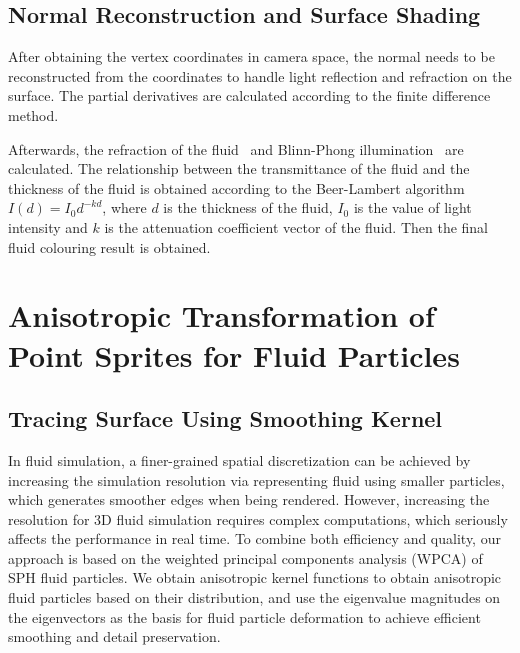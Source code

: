 \documentclass[times,twocolumn,final]{elsarticle}
\providecommand{\DIFaddend}{} %
\begin{document}
\DIFaddend \subsection{Normal Reconstruction and Surface Shading}
After obtaining the vertex coordinates in camera space, the normal needs to be reconstructed from the coordinates to handle light reflection and refraction on the surface. The partial derivatives are calculated according to the finite difference method.

Afterwards, the refraction of the fluid~\cite{ref:ref25} and Blinn-Phong illumination~\cite{ref:ref27} are calculated. The relationship between the transmittance of the fluid and the thickness of the fluid is obtained according to the Beer-Lambert algorithm\cite{ref:ref28} $I(d)=I_{0} d^{-k d}$, where $d$ is the thickness of the fluid, $I_0$ is the value of light intensity and $k$ is the attenuation coefficient vector of the fluid. Then the final fluid colouring result is obtained.

\section{Anisotropic Transformation of Point Sprites for Fluid Particles}
\subsection{Tracing Surface Using Smoothing Kernel}
In fluid simulation, a finer-grained spatial discretization can be achieved by increasing the simulation resolution via representing fluid using smaller particles, which generates smoother edges when being rendered. However, increasing the resolution for 3D fluid simulation requires complex computations, which seriously affects the performance in real time. To combine both efficiency and quality, our approach is based on the weighted principal components analysis (WPCA) of SPH fluid particles. We obtain anisotropic kernel functions to obtain anisotropic fluid particles based on their distribution, and use the eigenvalue magnitudes on the eigenvectors as the basis for fluid particle deformation to achieve efficient smoothing and detail preservation.
\end{document}

